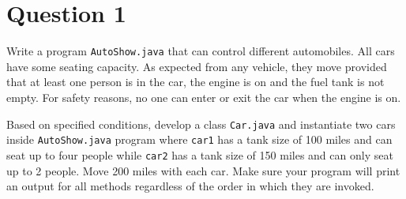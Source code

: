 \section*{Question 1}

Write a program \texttt{AutoShow.java} that can control different automobiles. All cars have some seating capacity. As expected from any vehicle, they move provided that at least one person is in the car, the engine is on and the fuel tank is not empty. For safety reasons, no one can enter or exit the car when the engine is on.

Based on specified conditions, develop a class \texttt{Car.java} and instantiate two cars inside \texttt{AutoShow.java} program where \texttt{car1} has a tank size of 100 miles and can seat up to four people while \texttt{car2} has a tank size of 150 miles and can only seat up to 2 people. Move 200 miles with each car. Make sure your program will print an output for all methods regardless of the order in which they are invoked.